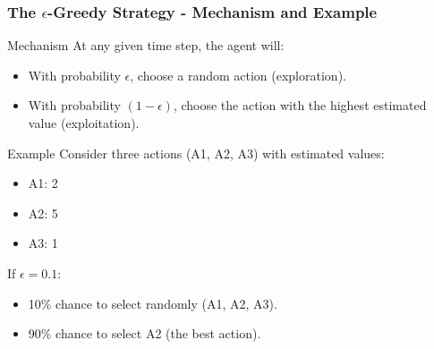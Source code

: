 \documentclass[aspectratio=169]{beamer}
\begin{document}
\begin{frame}[fragile]
    \frametitle{The $\epsilon$-Greedy Strategy - Mechanism and Example}
    \begin{block}{Mechanism}
        At any given time step, the agent will:
        \begin{itemize}
            \item With probability $\epsilon$, choose a random action (exploration).
            \item With probability $(1 - \epsilon)$, choose the action with the highest estimated value (exploitation).
        \end{itemize}
    \end{block}
    
    \begin{block}{Example}
        Consider three actions (A1, A2, A3) with estimated values:
        \begin{itemize}
            \item A1: 2
            \item A2: 5
            \item A3: 1
        \end{itemize}

        If $\epsilon = 0.1$: 
        \begin{itemize}
            \item 10\% chance to select randomly (A1, A2, A3).
            \item 90\% chance to select A2 (the best action).
        \end{itemize}
    \end{block}
\end{frame}
\end{document}
